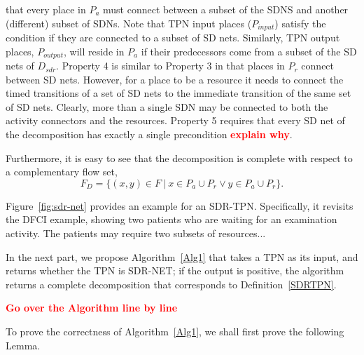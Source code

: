 \documentclass[11pt]{article}
\newcommand{\todo}[1]{\textcolor{red}{\bf {#1}}}
\begin{document}
that
every place in $P_a$ must connect between a subset
of the SDNS and another (different) subset of
SDNs. Note that TPN input places ($P_{input}$)
satisfy the condition 
if they are connected to a subset of SD nets.
Similarly, TPN output places, $P_{output}$, will reside 
in $P_a$ if their predecessors
come from a subset of the SD nets of $D_{sdr}$. 
Property 4 is similar to Property 3 in that
places in $P_r$ connect between SD nets. However,
for a place to be a resource it needs
to connect the timed transitions of a set of SD nets
to the immediate transition of the same set of SD nets. Clearly, 
more than a single SDN may be connected to both 
the activity connectors and the resources.
Property 5 requires that every SD net of the decomposition 
has exactly a single precondition \todo{explain why}.

Furthermore, it is easy to see that the decomposition is complete with 
respect to a complementary flow set, 
$$F_D = \{ (x,y) \in F \ | 
\ x\in P_a \cup P_r \lor y \in P_a \cup P_r \}.$$


Figure~\ref{fig:sdr-net} provides an example for an SDR-TPN. Specifically, 
it revisits the DFCI example, showing two patients who are waiting for an examination activity.
The patients may require two subsets of resources...

\noindent In the next part, we propose Algorithm~\ref{Alg1} that  
takes a TPN as its input, and returns
whether the TPN is SDR-NET; if the output is
positive, 
the algorithm returns
a complete decomposition that 
corresponds to Definition~\ref{SDRTPN}. 

\noindent \todo{Go over the Algorithm line by line}


\noindent To prove the correctness of Algorithm~\ref{Alg1},
we shall first prove the following Lemma.
\end{document}

